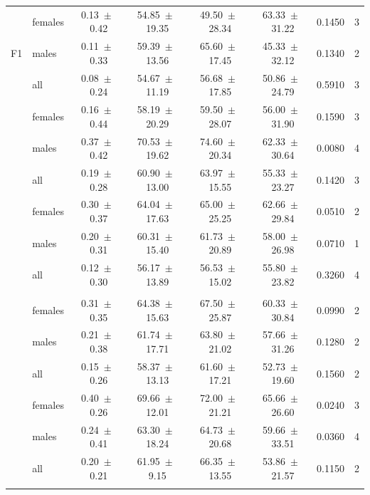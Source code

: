 \begin{table}[htb!]
\begin{threeparttable}
\begin{tabular}{c l c c c c c c}
			\multirow{3}{*}{F1} &
			  females & 0.13~$\pm$~0.42 & 54.85~$\pm$~19.35 & 49.50~$\pm$~28.34 & 63.33~$\pm$~31.22 & 0.1450 & 3 \\
			& males   & 0.11~$\pm$~0.33 & 59.39~$\pm$~13.56 & 65.60~$\pm$~17.45 & 45.33~$\pm$~32.12 & 0.1340 & 2 \\
			& all     & 0.08~$\pm$~0.24 & 54.67~$\pm$~11.19 & 56.68~$\pm$~17.85 & 50.86~$\pm$~24.79 & 0.5910 & 3 \\
			\noalign{\smallskip}
			
			\multirow{3}{*}{F2} &
			  females & 0.16~$\pm$~0.44 & 58.19~$\pm$~20.29 & 59.50~$\pm$~28.07 & 56.00~$\pm$~31.90 & 0.1590 & 3 \\
			& males   & 0.37~$\pm$~0.42 & 70.53~$\pm$~19.62 & 74.60~$\pm$~20.34 & 62.33~$\pm$~30.64 & 0.0080 & 4 \\
			& all     & 0.19~$\pm$~0.28 & 60.90~$\pm$~13.00 & 63.97~$\pm$~15.55 & 55.33~$\pm$~23.27 & 0.1420 & 3 \\
			\noalign{\smallskip}
			
			\multirow{3}{*}{F3} &
			  females & 0.30~$\pm$~0.37 & 64.04~$\pm$~17.63 & 65.00~$\pm$~25.25 & 62.66~$\pm$~29.84 & 0.0510 & 2 \\
			& males   & 0.20~$\pm$~0.31 & 60.31~$\pm$~15.40 & 61.73~$\pm$~20.89 & 58.00~$\pm$~26.98 & 0.0710 & 1 \\
			& all     & 0.12~$\pm$~0.30 & 56.17~$\pm$~13.89 & 56.53~$\pm$~15.02 & 55.80~$\pm$~23.82 & 0.3260 & 4 \\
			\noalign{\smallskip}
			
			\noalign{\smallskip}\hline\noalign{\smallskip}
			\multicolumn{8}{c}{Stress-modified reading} \\
			\noalign{\smallskip}\hline\noalign{\smallskip}
			
			\multirow{3}{*}{F1} &
			  females & 0.31~$\pm$~0.35 & 64.38~$\pm$~15.63 & 67.50~$\pm$~25.87 & 60.33~$\pm$~30.84 & 0.0990 & 2 \\
			& males   & 0.21~$\pm$~0.38 & 61.74~$\pm$~17.71 & 63.80~$\pm$~21.02 & 57.66~$\pm$~31.26 & 0.1280 & 2 \\
			& all     & 0.15~$\pm$~0.26 & 58.37~$\pm$~13.13 & 61.60~$\pm$~17.21 & 52.73~$\pm$~19.60 & 0.1560 & 2 \\
			\noalign{\smallskip}
			
			\multirow{3}{*}{F2} &
			  females & 0.40~$\pm$~0.26 & 69.66~$\pm$~12.01 & 72.00~$\pm$~21.21 & 65.66~$\pm$~26.60 & 0.0240 & 3 \\
			& males   & 0.24~$\pm$~0.41 & 63.30~$\pm$~18.24 & 64.73~$\pm$~20.68 & 59.66~$\pm$~33.51 & 0.0360 & 4 \\
			& all     & 0.20~$\pm$~0.21 & 61.95~$\pm$~9.15  & 66.35~$\pm$~13.55 & 53.86~$\pm$~21.57 & 0.1150 & 2 \\
			\noalign{\smallskip}
			

\end{tabular}
\end{threeparttable}
\end{table}
